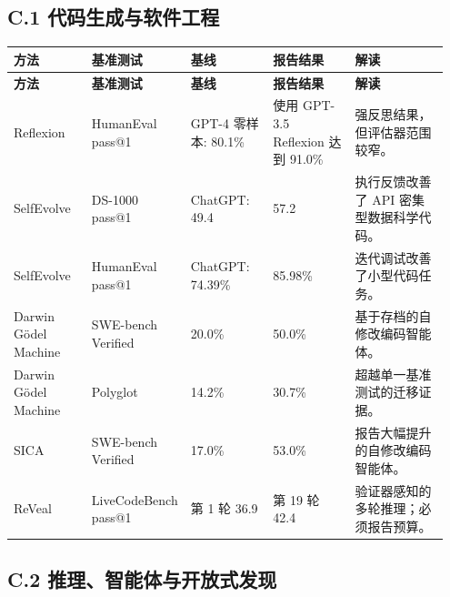 \subsection*{C.1 代码生成与软件工程}

{\TableTight
\begin{longtable}{@{}L{0.18\linewidth}L{0.17\linewidth}L{0.19\linewidth}L{0.19\linewidth}L{0.22\linewidth}@{}}
\toprule
\textbf{方法} & \textbf{基准测试} & \textbf{基线} & \textbf{报告结果} & \textbf{解读} \\
\midrule
\endfirsthead
\toprule
\textbf{方法} & \textbf{基准测试} & \textbf{基线} & \textbf{报告结果} & \textbf{解读} \\
\midrule
\endhead
\bottomrule
\endlastfoot
Reflexion & HumanEval pass@1 & GPT-4 零样本: 80.1\% & 使用 GPT-3.5 Reflexion 达到 91.0\% & 强反思结果，但评估器范围较窄。 \\
SelfEvolve & DS-1000 pass@1 & ChatGPT: 49.4 & 57.2 & 执行反馈改善了 API 密集型数据科学代码。 \\
SelfEvolve & HumanEval pass@1 & ChatGPT: 74.39\% & 85.98\% & 迭代调试改善了小型代码任务。 \\
Darwin G\"{o}del Machine & SWE-bench Verified & 20.0\% & 50.0\% & 基于存档的自修改编码智能体。 \\
Darwin G\"{o}del Machine & Polyglot & 14.2\% & 30.7\% & 超越单一基准测试的迁移证据。 \\
SICA & SWE-bench Verified & 17.0\% & 53.0\% & 报告大幅提升的自修改编码智能体。 \\
ReVeal & LiveCodeBench pass@1 & 第 1 轮 36.9 & 第 19 轮 42.4 & 验证器感知的多轮推理；必须报告预算。 \\
\end{longtable}}

\subsection*{C.2 推理、智能体与开放式发现}

